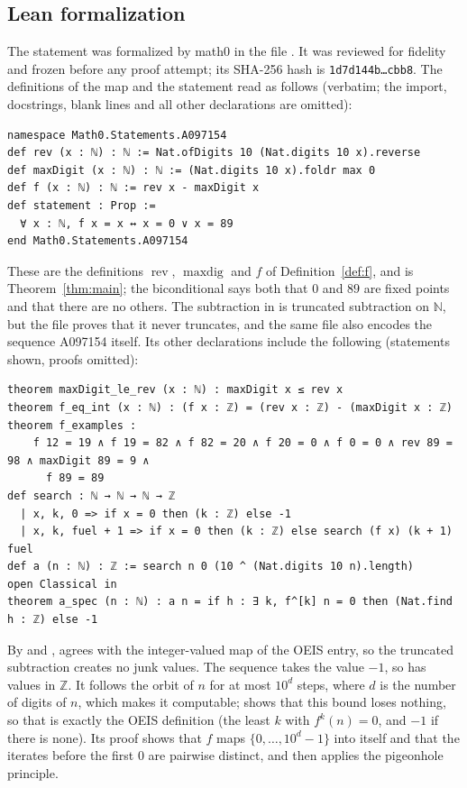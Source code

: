 \documentclass[11pt]{amsart}
\theoremstyle{plain}
\theoremstyle{definition}
\newcommand{\N}{\mathbb{N}}
\newcommand{\Z}{\mathbb{Z}}
\newcommand{\rev}{\operatorname{rev}}
\newcommand{\maxdig}{\operatorname{maxdig}}
\begin{document}
\subsection*{Lean formalization}
The statement was formalized by math0 in the file . It was reviewed for fidelity and frozen before any proof attempt; its SHA-256 hash is \texttt{1d7d144b\ldots cbb8}. The definitions of the map and the statement read as follows (verbatim; the import, docstrings, blank lines and all other declarations are omitted):
\begin{lstlisting}
namespace Math0.Statements.A097154
def rev (x : ℕ) : ℕ := Nat.ofDigits 10 (Nat.digits 10 x).reverse
def maxDigit (x : ℕ) : ℕ := (Nat.digits 10 x).foldr max 0
def f (x : ℕ) : ℕ := rev x - maxDigit x
def statement : Prop :=
  ∀ x : ℕ, f x = x ↔ x = 0 ∨ x = 89
end Math0.Statements.A097154
\end{lstlisting}
These are the definitions $\rev$, $\maxdig$ and $f$ of Definition~\ref{def:f}, and  is Theorem~\ref{thm:main}; the biconditional says both that $0$ and $89$ are fixed points and that there are no others. The subtraction in  is truncated subtraction on $\N$, but the file proves that it never truncates, and the same file also encodes the sequence A097154 itself. Its other declarations include the following (statements shown, proofs omitted):
\begin{lstlisting}
theorem maxDigit_le_rev (x : ℕ) : maxDigit x ≤ rev x
theorem f_eq_int (x : ℕ) : (f x : ℤ) = (rev x : ℤ) - (maxDigit x : ℤ)
theorem f_examples :
    f 12 = 19 ∧ f 19 = 82 ∧ f 82 = 20 ∧ f 20 = 0 ∧ f 0 = 0 ∧ rev 89 = 98 ∧ maxDigit 89 = 9 ∧
      f 89 = 89
def search : ℕ → ℕ → ℕ → ℤ
  | x, k, 0 => if x = 0 then (k : ℤ) else -1
  | x, k, fuel + 1 => if x = 0 then (k : ℤ) else search (f x) (k + 1) fuel
def a (n : ℕ) : ℤ := search n 0 (10 ^ (Nat.digits 10 n).length)
open Classical in
theorem a_spec (n : ℕ) : a n = if h : ∃ k, f^[k] n = 0 then (Nat.find h : ℤ) else -1
\end{lstlisting}
By  and ,  agrees with the integer-valued map of the OEIS entry, so the truncated subtraction creates no junk values.
The sequence takes the value $-1$, so  has values in $\Z$. It follows the orbit of $n$ for at most $10^d$ steps, where $d$ is the number of digits of $n$, which makes it computable;  shows that this bound loses nothing, so that  is exactly the OEIS definition (the least $k$ with $f^k(n)=0$, and $-1$ if there is none). Its proof shows that $f$ maps $\{0,\dots,10^d-1\}$ into itself and that the iterates before the first $0$ are pairwise distinct, and then applies the pigeonhole principle.
\end{document}
